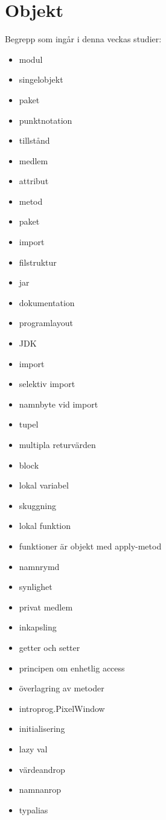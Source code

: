 \chapter{Objekt}\label{chapter:W04}
Begrepp som ingår i denna veckas studier:
\begin{multicols}{2}\begin{itemize}[noitemsep,label={$\square$},leftmargin=*]
\item modul
\item singelobjekt
\item paket
\item punktnotation
\item tillstånd
\item medlem
\item attribut
\item metod
\item paket
\item import
\item filstruktur
\item jar
\item dokumentation
\item programlayout
\item JDK
\item import
\item selektiv import
\item namnbyte vid import
\item tupel
\item multipla returvärden
\item block
\item lokal variabel
\item skuggning
\item lokal funktion
\item funktioner är objekt med apply-metod
\item namnrymd
\item synlighet
\item privat medlem
\item inkapsling
\item getter och setter
\item principen om enhetlig access
\item överlagring av metoder
\item introprog.PixelWindow
\item initialisering
\item lazy val
\item värdeandrop
\item namnanrop
\item typalias\end{itemize}\end{multicols}
